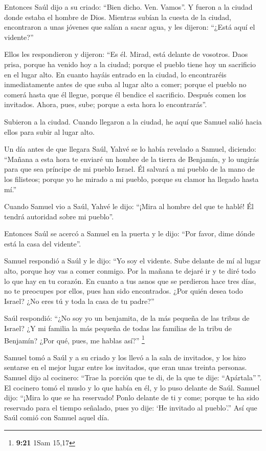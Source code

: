  Entonces Saúl dijo a su criado: ``Bien dicho. Ven.
Vamos''. Y fueron a la ciudad donde estaba el hombre de Dios.
 Mientras subían la cuesta de la ciudad, encontraron a
unas jóvenes que salían a sacar agua, y les dijeron: ``¿Está aquí el
vidente?''

 Ellos les respondieron y dijeron: ``Es él. Mirad, está
delante de vosotros. Daos prisa, porque ha venido hoy a la ciudad;
porque el pueblo tiene hoy un sacrificio en el lugar alto.
 En cuanto hayáis entrado en la ciudad, lo encontraréis
inmediatamente antes de que suba al lugar alto a comer; porque el pueblo
no comerá hasta que él llegue, porque él bendice el sacrificio. Después
comen los invitados. Ahora, pues, sube; porque a esta hora lo
encontrarás''.

 Subieron a la ciudad. Cuando llegaron a la ciudad, he
aquí que Samuel salió hacia ellos para subir al lugar alto.

 Un día antes de que llegara Saúl, Yahvé se lo había
revelado a Samuel, diciendo:  ``Mañana a esta hora te
enviaré un hombre de la tierra de Benjamín, y lo ungirás para que sea
príncipe de mi pueblo Israel. Él salvará a mi pueblo de la mano de los
filisteos; porque yo he mirado a mi pueblo, porque su clamor ha llegado
hasta mí.''

 Cuando Samuel vio a Saúl, Yahvé le dijo: ``¡Mira al
hombre del que te hablé! Él tendrá autoridad sobre mi pueblo''.

 Entonces Saúl se acercó a Samuel en la puerta y le dijo:
``Por favor, dime dónde está la casa del vidente''.

 Samuel respondió a Saúl y le dijo: ``Yo soy el vidente.
Sube delante de mí al lugar alto, porque hoy vas a comer conmigo. Por la
mañana te dejaré ir y te diré todo lo que hay en tu corazón.
 En cuanto a tus asnos que se perdieron hace tres días,
no te preocupes por ellos, pues han sido encontrados. ¿Por quién desea
todo Israel? ¿No eres tú y toda la casa de tu padre?''

 Saúl respondió: ``¿No soy yo un benjamita, de la más
pequeña de las tribus de Israel? ¿Y mi familia la más pequeña de todas
las familias de la tribu de Benjamín? ¿Por qué, pues, me hablas así?''
\footnote{\textbf{9:21} 1Sam 15,17}

 Samuel tomó a Saúl y a su criado y los llevó a la sala
de invitados, y los hizo sentarse en el mejor lugar entre los invitados,
que eran unas treinta personas.  Samuel dijo al cocinero:
``Trae la porción que te di, de la que te dije: ``Apártala''\,''.
 El cocinero tomó el muslo y lo que había en él, y lo
puso delante de Saúl. Samuel dijo: ``¡Mira lo que se ha reservado! Ponlo
delante de ti y come; porque te ha sido reservado para el tiempo
señalado, pues yo dije: `He invitado al pueblo'.'' Así que Saúl comió
con Samuel aquel día.

